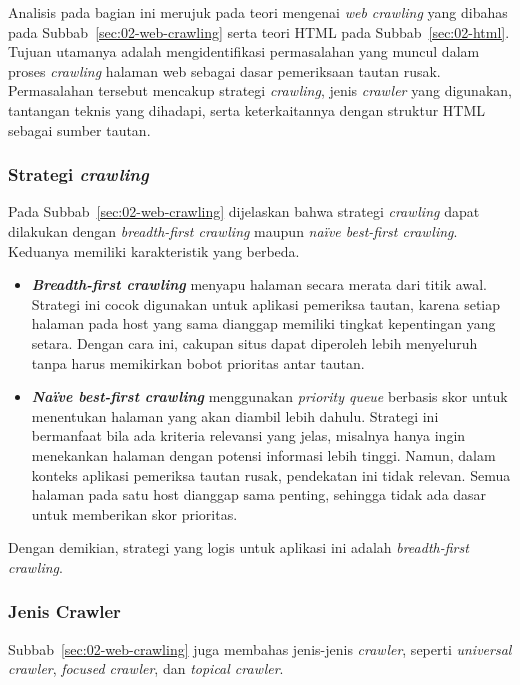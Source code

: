 
Analisis pada bagian ini merujuk pada teori mengenai \textit{web crawling} yang dibahas pada Subbab~\ref{sec:02-web-crawling} serta teori HTML pada Subbab~\ref{sec:02-html}. Tujuan utamanya adalah mengidentifikasi permasalahan yang muncul dalam proses \textit{crawling} halaman web sebagai dasar pemeriksaan tautan rusak. Permasalahan tersebut mencakup strategi \textit{crawling}, jenis \textit{crawler} yang digunakan, tantangan teknis yang dihadapi, serta keterkaitannya dengan struktur HTML sebagai sumber tautan.

\subsubsection*{Strategi \textit{crawling}}
Pada Subbab~\ref{sec:02-web-crawling} dijelaskan bahwa strategi \textit{crawling} dapat dilakukan dengan \textit{breadth-first crawling} maupun \textit{na\"{i}ve best-first crawling}. Keduanya memiliki karakteristik yang berbeda.  

\begin{itemize}
  \item \textbf{\textit{Breadth-first crawling}} menyapu halaman secara merata dari titik awal. Strategi ini cocok digunakan untuk aplikasi pemeriksa tautan, karena setiap halaman pada host yang sama dianggap memiliki tingkat kepentingan yang setara. Dengan cara ini, cakupan situs dapat diperoleh lebih menyeluruh tanpa harus memikirkan bobot prioritas antar tautan.
  \item \textbf{\textit{Na\"{i}ve best-first crawling}} menggunakan \textit{priority queue} berbasis skor untuk menentukan halaman yang akan diambil lebih dahulu. Strategi ini bermanfaat bila ada kriteria relevansi yang jelas, misalnya hanya ingin menekankan halaman dengan potensi informasi lebih tinggi. Namun, dalam konteks aplikasi pemeriksa tautan rusak, pendekatan ini tidak relevan. Semua halaman pada satu host dianggap sama penting, sehingga tidak ada dasar untuk memberikan skor prioritas.
\end{itemize}

Dengan demikian, strategi yang logis untuk aplikasi ini adalah \textit{breadth-first crawling}.

\subsubsection*{Jenis Crawler}
Subbab~\ref{sec:02-web-crawling} juga membahas jenis-jenis \textit{crawler}, seperti \textit{universal crawler}, \textit{focused crawler}, dan \textit{topical crawler}.  

